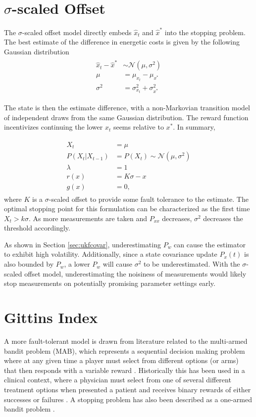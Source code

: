 \section{$\sigma$-scaled Offset}
The $\sigma$-scaled offset model directly embeds $\hat{x}_t$ and $\hat{x}^*$ into the stopping problem. The best estimate of the difference in energetic costs is given by the following Gaussian distribution
\begin{align}
\begin{split}
  \hat{x}_t - \hat{x}^* &\sim \mathcal{N}(\mu, \sigma^2)\\
  \mu &= \mu_{x_t} - \mu_{x^*}\\
  \sigma^2 &= \sigma^2_{x_t} + \sigma^2_{x^*}
\end{split}
\end{align}

The state is then the estimate difference, with a non-Markovian transition model of independent draws from the same Gaussian distribution. The reward function incentivizes continuing the lower $x_t$ seems relative to $x^*$. In summary,

\begin{align}
\begin{split}
  X_t &= \mu\\
  P(X_t \vert X_{t-1}) &= P(X_t) \sim \mathcal{N}(\mu, \sigma^2)\\
  \lambda &= 1\\
  r(x) &= K\sigma-x\\
  g(x) &= 0,
\end{split}
\end{align}
where $K$ is a $\sigma$-scaled offset to provide some fault tolerance to the estimate. The optimal stopping point for this formulation can be characterized as the first time $X_t > k\sigma$. As more measurements are taken and $P_{xx}$ decreases, $\sigma^2$ decreases the threshold accordingly.

As shown in Section \ref{sec:ukfcovar}, underestimating $P_w$ can cause the estimator to exhibit high volatility. Additionally, since a state covariance update $P_x(t)$ is also bounded by $P_w$, a lower $P_w$ will cause $\sigma^2$ to be underestimated. With the $\sigma$-scaled offset model, underestimating the noisiness of measurements would likely stop measurements on potentially promising parameter settings early. 

\section{Gittins Index}
A more fault-tolerant model is drawn from literature related to the multi-armed bandit problem (MAB), which represents a sequential decision making problem where at any given time a player must select from different options (or arms) that then responds with a variable reward \citep{gelman2004bayesian}. Historically this has been used in a clinical context, where a physician must select from one of several different treatment options when presented a patient and receives binary rewards of either successes or failures \citep{Villar2015}. A stopping problem has also been described as a one-armed bandit problem \citep{gelman2004bayesian}.


